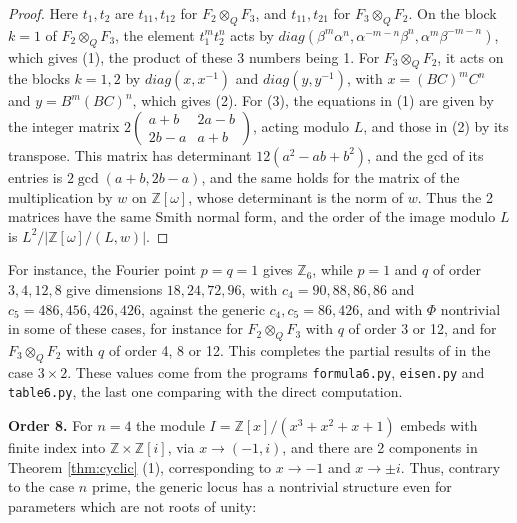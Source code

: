 \documentclass[11pt]{amsart}
\begin{document}
\begin{proof}
Here $t_1,t_2$ are $t_{11},t_{12}$ for $F_2\otimes_QF_3$, and $t_{11},t_{21}$ for $F_3\otimes_QF_2$. On the block $k=1$ of $F_2\otimes_QF_3$, the element $t_1^mt_2^n$ acts by $diag(\beta^m\alpha^n,\alpha^{-m-n}\beta^n,\alpha^m\beta^{-m-n})$, which gives (1), the product of these 3 numbers being 1. For $F_3\otimes_QF_2$, it acts on the blocks $k=1,2$ by $diag(x,x^{-1})$ and $diag(y,y^{-1})$, with $x=(BC)^mC^n$ and $y=B^m(BC)^n$, which gives (2). For (3), the equations in (1) are given by the integer matrix $2\begin{pmatrix}a+b&2a-b\\ 2b-a&a+b\end{pmatrix}$, acting modulo $L$, and those in (2) by its transpose. This matrix has determinant $12(a^2-ab+b^2)$, and the gcd of its entries is $2\gcd(a+b,2b-a)$, and the same holds for the matrix of the multiplication by $w$ on $\mathbb Z[\omega]$, whose determinant is the norm of $w$. Thus the 2 matrices have the same Smith normal form, and the order of the image modulo $L$ is $L^2/|\mathbb Z[\omega]/(L,w)|$.
\end{proof}

\noindent For instance, the Fourier point $p=q=1$ gives $\mathbb Z_6$, while $p=1$ and $q$ of order $3,4,12,8$ give dimensions $18,24,72,96$, with $c_4=90,88,86,86$ and $c_5=486,456,426,426$, against the generic $c_4,c_5=86,426$, and with $\Phi$ nontrivial in some of these cases, for instance for $F_2\otimes_QF_3$ with $q$ of order 3 or 12, and for $F_3\otimes_QF_2$ with $q$ of order 4, 8 or 12. This completes the partial results of \cite[Section 5]{bic} in the case $3\times2$. These values come from the programs \texttt{formula6.py}, \texttt{eisen.py} and \texttt{table6.py}, the last one comparing with the direct computation.

\medskip

\noindent\textbf{Order 8.} For $n=4$ the module $I=\mathbb Z[x]/(x^3+x^2+x+1)$ embeds with finite index into $\mathbb Z\times\mathbb Z[i]$, via $x\to(-1,i)$, and there are 2 components in Theorem \ref{thm:cyclic} (1), corresponding to $x\to-1$ and $x\to\pm i$. Thus, contrary to the case $n$ prime, the generic locus has a nontrivial structure even for parameters which are not roots of unity:
\end{document}
